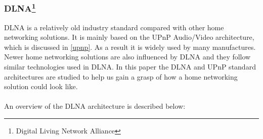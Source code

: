\subsubsection[DLNA]{DLNA\footnote{Digital Living Network Alliance}} 
DLNA is a relatively old industry standard compared with other home networking 
solutions. It is mainly based on the UPnP Audio/Video architecture, which is 
discussed in \ref{upnp}. As a result it is widely used by many manufactures. Newer 
home networking solutions are also influenced by DLNA and they follow similar 
technologies used in DLNA. In this paper the DLNA and UPnP standard architectures are studied to help us gain a grasp of how a home networking solution could look like. \\
\\
An overview of the DLNA architecture \cite{dlna_guideline} is described below: 

